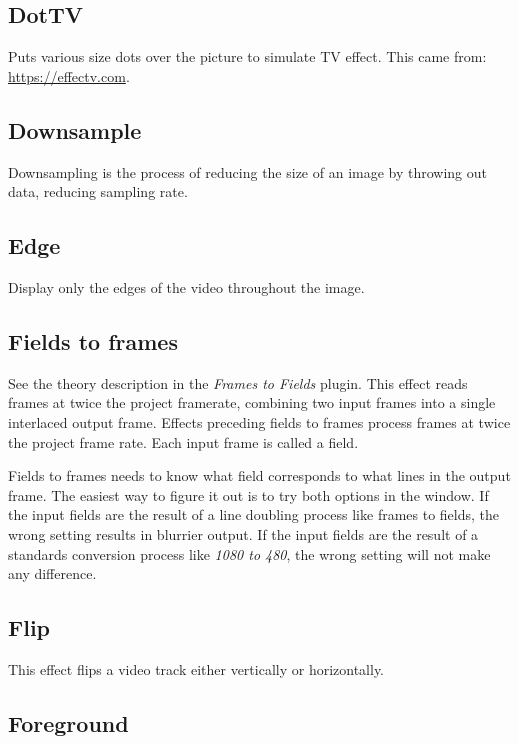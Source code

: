 \subsection{DotTV}%
\label{sub:dottv}

Puts various size dots over the picture to simulate TV effect. This came from: {\small \url{https://effectv.com}}.

\subsection{Downsample}%
\label{sub:downsample}

Downsampling is the process of reducing the size of an image by throwing out data, reducing sampling rate.

\subsection{Edge}%
\label{sub:edge}

Display only the edges of the video throughout the image.

\subsection{Fields to frames}%
\label{sub:fields_to_frames}

See the theory description in the \textit{Frames to Fields} plugin. This effect reads frames at twice the project framerate, combining two input frames into a single interlaced output frame. Effects preceding fields to frames process frames at twice the project frame rate. Each input frame is called a field.

Fields to frames needs to know what field corresponds to what lines in the output frame. The easiest way to figure it out is to try both options in the window. If the input fields are the result of a line doubling process like frames to fields, the wrong setting results in blurrier output. If the input fields are the result of a standards conversion process like \textit{1080 to 480}, the wrong setting will not make any difference.

\subsection{Flip}%
\label{sub:flip}

This effect flips a video track either vertically or horizontally.

\subsection{Foreground}%
\label{sub:foreground}

